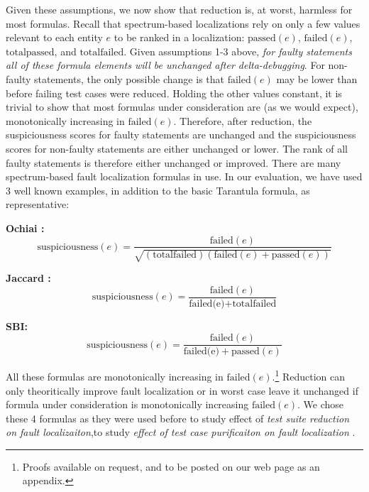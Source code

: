 Given these assumptions, we now show that reduction is, at worst,
harmless for most formulas.  Recall that spectrum-based localizations
rely on only a few values relevant to each entity $e$ to be ranked in
a localization: $\text{passed}(e)$, $\text{failed}(e)$,
$\text{totalpassed}$, and $\text{totalfailed}$.  Given assumptions 1-3
above, \emph{for faulty statements all of these formula elements will
be unchanged after delta-debugging}.  For non-faulty statements, the
only possible change is that $ \text{failed}(e)$ may be lower than
before failing test cases were reduced. Holding the other values
constant, it is trivial to show that most formulas under consideration
are (as we would expect), monotonically increasing in
$\text{failed}(e)$.  Therefore, after reduction, the suspiciousness
scores for faulty statements are unchanged and the suspiciousness
scores for non-faulty statements are either unchanged or lower.  The
rank of all faulty statements is therefore either unchanged or
improved.  There are many spectrum-based fault localization formulas
in use. In our evaluation, we have used 3 well known examples, in
addition to the basic Tarantula \cite{Jones2002} formula, as
representative:

{\bf Ochiai \cite{Ochai}:}
$$ \text{suspiciousness}(e) = \frac{\text{failed}(e)}{\sqrt{(\text{totalfailed}) (\text{failed}(e) + \text{passed}(e))}} $$

{\bf Jaccard \cite{Pinpoint}:}
$$ \text{suspiciousness}(e) = \frac{\text{failed}(e)}{\text{failed(e)} + \text{totalfailed}} $$

{\bf SBI: \cite{EmpirReduce,StatDebug}}
$$ \text{suspiciousness}(e) = \frac{\text{failed}(e)}{\text{failed(e)} + \text{passed}(e)} $$


All these formulas are monotonically increasing in
$\text{failed}(e)$.\footnote{Proofs available on request, and to be posted on our web page as an appendix.} Reduction can only theoritically improve fault localization or in worst case leave it unchanged if formula under consideration is monotonically increasing $\text{failed}(e)$. We chose these 4 formulas as they were used before to study effect of \emph{test suite reduction on fault localizaiton},to study \emph{effect of test case purificaiton on fault localization} \cite{EmpirReduce} \cite{PureTest}. 



